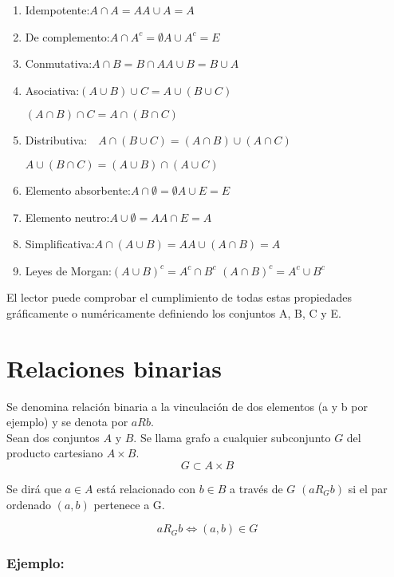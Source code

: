 \begin{enumerate}
\item Idempotente:\quad $A\cap A=A$\quad  $A\cup A=A$
\item De complemento:\quad $A\cap A^c=\emptyset$\quad  $A\cup A^c=E$
\item Conmutativa:\quad $A\cap B=B\cap A$\quad  $A\cup B=B\cup A$
\item Asociativa:\quad $(A\cup B)\cup C=A\cup (B\cup C)$

\hspace{3.14 cm}  $(A\cap B)\cap C=A\cap (B\cap C)$
\item Distributiva:\ \ $A\cap (B\cup C)=(A\cap B)\cup (A\cap C)$ 

\hspace{2.4 cm} $A\cup (B\cap C)=(A\cup B)\cap (A\cup C)$
\item Elemento absorbente:\quad $A\cap \emptyset=\emptyset$\quad  $A\cup E=E$
\item Elemento neutro:\quad $A\cup \emptyset=A$\quad  $A\cap E=A$
\item Simplificativa:\quad $A\cap(A\cup B)=A$\quad  $A\cup(A\cap B)=A$
\item Leyes de Morgan:\quad  $(A\cup B)^c=A^c \cap B^c$ \quad  $(A\cap B)^c=A^c\cup B^c$\\
\end{enumerate}

El lector puede comprobar el cumplimiento de todas estas propiedades gráficamente o numéricamente definiendo los conjuntos A, B, C y E.
\newpage
\section{Relaciones binarias}

Se denomina relación binaria a la vinculación de dos elementos (a y b por ejemplo) y se denota por $aRb$.\\

Sean dos conjuntos $A$ y $B$. Se llama grafo a cualquier subconjunto $G$ del producto cartesiano $A\times B$.
$$
G \subset A\times B
$$

Se dirá que $a\in A$ está relacionado con $b\in B$ a través de $G$ $(aR_Gb)$ si el par ordenado $(a,b)$ pertenece a G.

$$
aR_Gb \Leftrightarrow (a,b) \in G
$$

\subsubsection*{Ejemplo:}

